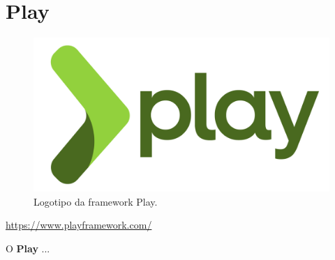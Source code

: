 \section{Play}
\label{subsec:play}

\begin{figure}[H]
    \centering
    \includegraphics[scale=0.05]{images/play.png}
    \caption{Logotipo da framework Play.}
    \label{fig:play}
\end{figure}

\href{https://www.playframework.com/}{https://www.playframework.com/}

\hspace{5mm} O \textbf{Play} ...